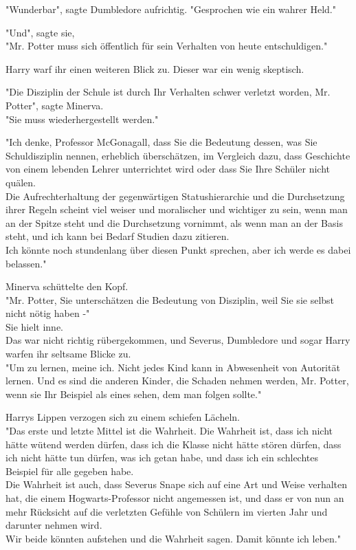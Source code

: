 {"Wunderbar", sagte Dumbledore aufrichtig. "Gesprochen wie ein wahrer Held."

"Und", sagte sie,\\ "Mr. Potter muss sich öffentlich für sein Verhalten von heute entschuldigen."

Harry warf ihr einen weiteren Blick zu. Dieser war ein wenig skeptisch.

"Die Disziplin der Schule ist durch Ihr Verhalten schwer verletzt worden, Mr. Potter", sagte Minerva.\\ "Sie muss wiederhergestellt werden."

"Ich denke, Professor McGonagall, dass Sie die Bedeutung dessen, was Sie Schuldisziplin nennen, erheblich überschätzen, im Vergleich dazu, dass Geschichte von einem lebenden Lehrer unterrichtet wird oder dass Sie Ihre Schüler nicht quälen.\\ Die Aufrechterhaltung der gegenwärtigen Statushierarchie und die Durchsetzung ihrer Regeln scheint viel weiser und moralischer und wichtiger zu sein, wenn man an der Spitze steht und die Durchsetzung vornimmt, als wenn man an der Basis steht, und ich kann bei Bedarf Studien dazu zitieren.\\ Ich könnte noch stundenlang über diesen Punkt sprechen, aber ich werde es dabei belassen."

Minerva schüttelte den Kopf.\\ "Mr. Potter, Sie unterschätzen die Bedeutung von Disziplin, weil Sie sie selbst nicht nötig haben -"\\ Sie hielt inne.\\ Das war nicht richtig rübergekommen, und Severus, Dumbledore und sogar Harry warfen ihr seltsame Blicke zu.\\ "Um zu lernen, meine ich. Nicht jedes Kind kann in Abwesenheit von Autorität lernen. Und es sind die anderen Kinder, die Schaden nehmen werden, Mr. Potter, wenn sie Ihr Beispiel als eines sehen, dem man folgen sollte."

Harrys Lippen verzogen sich zu einem schiefen Lächeln.\\ "Das erste und letzte Mittel ist die Wahrheit. Die Wahrheit ist, dass ich nicht hätte wütend werden dürfen, dass ich die Klasse nicht hätte stören dürfen, dass ich nicht hätte tun dürfen, was ich getan habe, und dass ich ein schlechtes Beispiel für alle gegeben habe.\\ Die Wahrheit ist auch, dass Severus Snape sich auf eine Art und Weise verhalten hat, die einem Hogwarts-Professor nicht angemessen ist, und dass er von nun an mehr Rücksicht auf die verletzten Gefühle von Schülern im vierten Jahr und darunter nehmen wird.\\ Wir beide könnten aufstehen und die Wahrheit sagen. Damit könnte ich leben."

}
